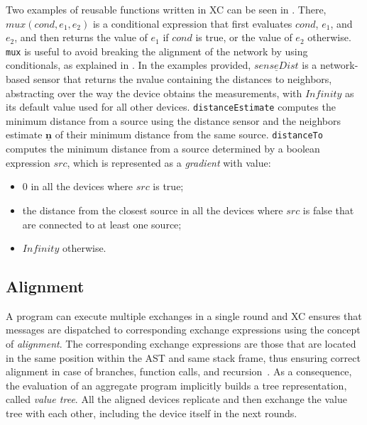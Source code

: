 Two examples of reusable functions written in \ac{XC} can be seen in .
%
There, $mux(cond, e_1, e_2)$ is a conditional expression that first evaluates $cond$, $e_1$, and $e_2$, and then returns the value of $e_1$ if $cond$ is true, or the value of $e_2$ otherwise.
%
\texttt{mux} is useful to avoid breaking the alignment of the network by using conditionals, as explained in .
%
In the examples provided, $\underline{senseDist}$ is a network-based sensor that returns the nvalue containing the distances to neighbors, abstracting over the way the device obtains the measurements, with $Infinity$ as its default value used for all other devices.
%
\texttt{distanceEstimate} computes the minimum distance from a source using the distance sensor and the neighbors estimate $\underline{\mathbf{n}}$ of their minimum distance from the same source.
%
\texttt{distanceTo} computes the minimum distance from a source determined by a boolean expression $src$, which is represented as a \textit{gradient} with value:
\begin{itemize}
    \item $0$ in all the devices where $src$ is true;
    \item the distance from the closest source in all the devices where $src$ is false that are connected to at least one source;
    \item $Infinity$ otherwise.
\end{itemize}



\subsection{Alignment}\label{chap:background->sec:xc->subsec:alignment}

A program can execute multiple exchanges in a single round and \ac{XC} ensures that messages are dispatched to corresponding exchange expressions using the concept of \textit{alignment}.
%
The corresponding exchange expressions are those that are located in the same position within the \ac{AST} and same stack frame, thus ensuring correct alignment in case of branches, function calls, and recursion~\cite{xc}.
%
As a consequence, the evaluation of an aggregate program implicitly builds a tree representation, called \textit{value tree}.
%
All the aligned devices replicate and then exchange the value tree with each other, including the device itself in the next rounds.

